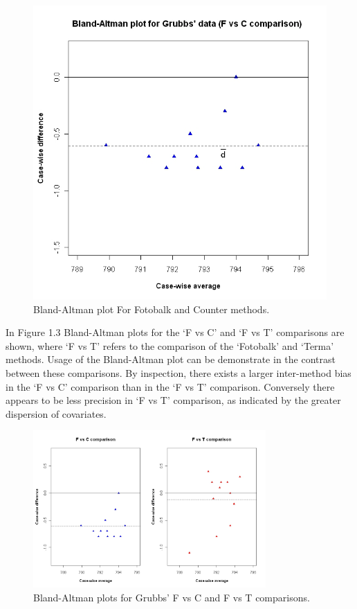 \documentclass[12pt, a4paper]{report}
\theoremstyle{plain}
\theoremstyle{definition}
\theoremstyle{remark}
\begin{document}
	\newpage
	
	\begin{figure}[h!]
		\begin{center}
			\includegraphics[width=120mm]{images/GrubbsBAplot-noLOA.jpeg}
			\caption{Bland-Altman plot For Fotobalk and Counter methods.}\label{GrubbsBA-noLOA}
		\end{center}
	\end{figure}
	
	
	
	In Figure 1.3 Bland-Altman plots for the `F vs C' and `F vs T'
	comparisons are shown, where `F vs T' refers to the comparison of
	the `Fotobalk' and `Terma' methods. Usage of the Bland-Altman plot
	can be demonstrate in the contrast between these comparisons. By inspection, there exists a larger inter-method bias in the `F vs C' comparison than in the `F vs T' comparison. Conversely there
	appears to be less precision in `F vs T' comparison, as indicated
	by the greater dispersion of covariates.
	
	\begin{figure}[h!]
		\begin{center}
			\includegraphics[height=60mm]{images/GrubbsDataTwoBAplots.jpeg}
			\caption{Bland-Altman plots for Grubbs' F vs C and F vs T comparisons.}\label{GrubbsDataTwoBAplots}
		\end{center}
	\end{figure}
	
\end{document}
